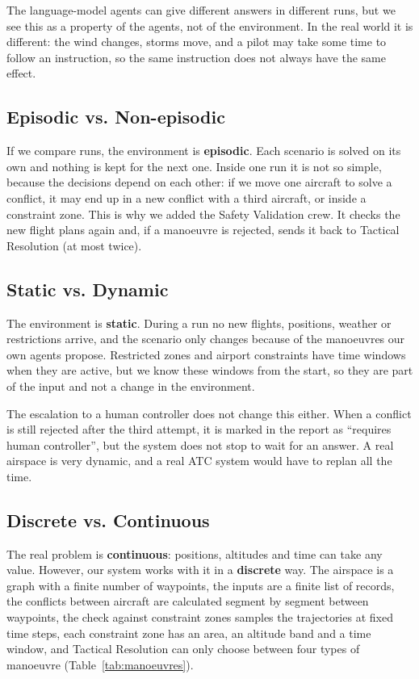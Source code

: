 The language-model agents can give different answers in different runs, but we see this as a property
of the agents, not of the environment. In the real world it is different: the wind changes,
storms move, and a pilot may take some time to follow an instruction, so the same
instruction does not always have the same effect.

\subsection{Episodic vs. Non-episodic}

If we compare runs, the environment is \textbf{episodic}. Each scenario is solved on its own
and nothing is kept for the next one. Inside one run it is not so simple, because the
decisions depend on each other: if we move one aircraft to solve a conflict, it may end up
in a new conflict with a third aircraft, or inside a constraint zone. This is why we
added the Safety Validation crew. It checks the new flight plans again and, if a manoeuvre
is rejected, sends it back to Tactical Resolution (at most twice).

\subsection{Static vs. Dynamic}

The environment is \textbf{static}. During a run no new flights, positions, weather or
restrictions arrive, and the scenario only changes because of the manoeuvres our own agents
propose. Restricted zones and airport constraints have time windows when they are active,
but we know these windows from the start, so they are part of the input and not a change in
the environment.

The escalation to a human controller does not change this either. When a conflict is still
rejected after the third attempt, it is marked in the report as ``requires human controller'',
but the system does not stop to wait for an answer. A real airspace is very dynamic, and a
real ATC system would have to replan all the time.

\subsection{Discrete vs. Continuous}

The real problem is \textbf{continuous}: positions, altitudes and time can take any value.
However, our system works with it in a \textbf{discrete} way. The airspace is a graph with a
finite number of waypoints, the inputs are a finite list of records, the conflicts between aircraft are calculated segment by segment between waypoints, the
check against constraint zones samples the trajectories at fixed time steps, each constraint zone has an area, an altitude band and
a time window, and Tactical Resolution can only choose between four types of manoeuvre (Table~\ref{tab:manoeuvres}).

